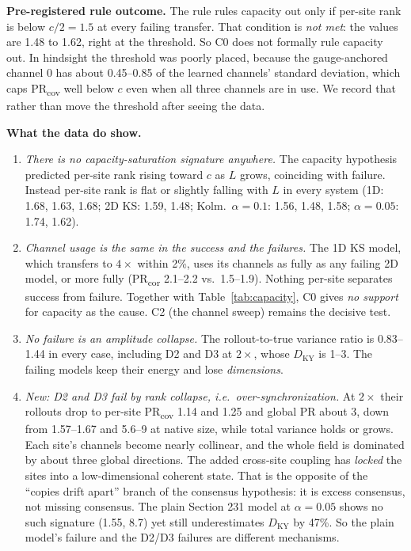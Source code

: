 \documentclass[11pt]{article}
\begin{document}
\textbf{Pre-registered rule outcome.} The rule rules capacity out only if
per-site rank is below $c/2=1.5$ at every failing transfer. That condition
is \emph{not met}: the values are 1.48 to 1.62, right at the threshold. So
C0 does not formally rule capacity out. In hindsight the threshold was
poorly placed, because the gauge-anchored channel 0 has about 0.45--0.85
of the learned channels' standard deviation, which caps PR\textsubscript{cov}
well below $c$ even when all three channels are in use. We record that
rather than move the threshold after seeing the data.

\textbf{What the data do show.}
\begin{enumerate}[leftmargin=*]
\item \emph{There is no capacity-saturation signature anywhere.} The
  capacity hypothesis predicted per-site rank rising toward $c$ as $L$
  grows, coinciding with failure. Instead per-site rank is flat or
  slightly falling with $L$ in every system (1D: 1.68, 1.63, 1.68; 2D KS:
  1.59, 1.48; Kolm.\ $\alpha{=}0.1$: 1.56, 1.48, 1.58; $\alpha{=}0.05$:
  1.74, 1.62).
\item \emph{Channel usage is the same in the success and the failures.}
  The 1D KS model, which transfers to $4\times$ within 2\%, uses its
  channels as fully as any failing 2D model, or more fully
  (PR\textsubscript{cor} 2.1--2.2 vs.\ 1.5--1.9). Nothing per-site
  separates success from failure. Together with
  Table~\ref{tab:capacity}, C0 gives \emph{no support} for capacity as the
  cause. C2 (the channel sweep) remains the decisive test.
\item \emph{No failure is an amplitude collapse.} The rollout-to-true
  variance ratio is 0.83--1.44 in every case, including D2 and D3 at
  $2\times$, whose $D_{\mathrm{KY}}$ is 1--3. The failing models keep
  their energy and lose \emph{dimensions}.
\item \emph{New: D2 and D3 fail by rank collapse, i.e.\
  over-synchronization.} At $2\times$ their rollouts drop to per-site
  PR\textsubscript{cov} 1.14 and 1.25 and global PR about 3, down from
  1.57--1.67 and 5.6--9 at native size, while total variance holds or
  grows. Each site's channels become nearly collinear, and the whole field
  is dominated by about three global directions. The added cross-site
  coupling has \emph{locked} the sites into a low-dimensional coherent
  state. That is the opposite of the ``copies drift apart'' branch of the
  consensus hypothesis: it is excess consensus, not missing consensus.
  The plain Section 231 model at $\alpha{=}0.05$ shows no such
  signature (1.55, 8.7) yet still underestimates $D_{\mathrm{KY}}$ by
  47\%. So the plain model's failure and the D2/D3 failures are
  different mechanisms.
\end{enumerate}
\end{document}
